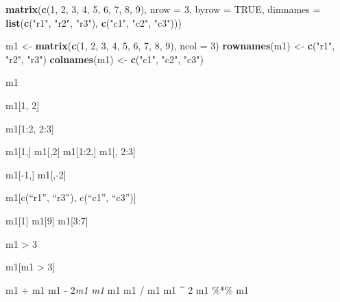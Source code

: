 \documentclass[]{book}
\newenvironment{Shaded}{\begin{snugshade}}{\end{snugshade}}
\newcommand{\DataTypeTok}[1]{\textcolor[rgb]{0.13,0.29,0.53}{#1}}
\newcommand{\DecValTok}[1]{\textcolor[rgb]{0.00,0.00,0.81}{#1}}
\newcommand{\KeywordTok}[1]{\textcolor[rgb]{0.13,0.29,0.53}{\textbf{#1}}}
\newcommand{\NormalTok}[1]{#1}
\newcommand{\OtherTok}[1]{\textcolor[rgb]{0.56,0.35,0.01}{#1}}
\newcommand{\StringTok}[1]{\textcolor[rgb]{0.31,0.60,0.02}{#1}}
\theoremstyle{definition}
\theoremstyle{definition}
\theoremstyle{definition}
\theoremstyle{remark}
\begin{document}
\begin{Shaded}
\begin{Highlighting}[]
\KeywordTok{matrix}\NormalTok{(}\KeywordTok{c}\NormalTok{(}\DecValTok{1}\NormalTok{, }\DecValTok{2}\NormalTok{, }\DecValTok{3}\NormalTok{, }\DecValTok{4}\NormalTok{, }\DecValTok{5}\NormalTok{, }\DecValTok{6}\NormalTok{, }\DecValTok{7}\NormalTok{, }\DecValTok{8}\NormalTok{, }\DecValTok{9}\NormalTok{), }\DataTypeTok{nrow =} \DecValTok{3}\NormalTok{, }\DataTypeTok{byrow =} \OtherTok{TRUE}\NormalTok{, }\DataTypeTok{dimnames =} \KeywordTok{list}\NormalTok{(}\KeywordTok{c}\NormalTok{(}\StringTok{"r1"}\NormalTok{, }\StringTok{"r2"}\NormalTok{, }\StringTok{"r3"}\NormalTok{), }\KeywordTok{c}\NormalTok{(}\StringTok{"c1"}\NormalTok{, }\StringTok{"c2"}\NormalTok{, }\StringTok{"c3"}\NormalTok{)))}
\end{Highlighting}
\end{Shaded}

\begin{Shaded}
\begin{Highlighting}[]
\NormalTok{m1 <-}\StringTok{ }\KeywordTok{matrix}\NormalTok{(}\KeywordTok{c}\NormalTok{(}\DecValTok{1}\NormalTok{, }\DecValTok{2}\NormalTok{, }\DecValTok{3}\NormalTok{, }\DecValTok{4}\NormalTok{, }\DecValTok{5}\NormalTok{, }\DecValTok{6}\NormalTok{, }\DecValTok{7}\NormalTok{, }\DecValTok{8}\NormalTok{, }\DecValTok{9}\NormalTok{), }\DataTypeTok{ncol =} \DecValTok{3}\NormalTok{)}
\KeywordTok{rownames}\NormalTok{(m1) <-}\StringTok{ }\KeywordTok{c}\NormalTok{(}\StringTok{"r1"}\NormalTok{, }\StringTok{"r2"}\NormalTok{, }\StringTok{"r3"}\NormalTok{)}
\KeywordTok{colnames}\NormalTok{(m1) <-}\StringTok{ }\KeywordTok{c}\NormalTok{(}\StringTok{"c1"}\NormalTok{, }\StringTok{"c2"}\NormalTok{, }\StringTok{"c3"}\NormalTok{)}

\NormalTok{m1}
\end{Highlighting}
\end{Shaded}

m1{[}1, 2{]}

m1{[}1:2, 2:3{]}

m1{[}1,{]} m1{[},2{]} m1{[}1:2,{]} m1{[}, 2:3{]}

m1{[}-1,{]} m1{[},-2{]}

m1{[}c(``r1'', ``r3''), c(``c1'', ``c3''){]}

m1{[}1{]} m1{[}9{]} m1{[}3:7{]}

m1 \textgreater{} 3

m1{[}m1 \textgreater{} 3{]}

m1 + m1 m1 - 2\emph{m1 m1 } m1 m1 / m1 m1 \^{} 2 m1 \%*\% m1
\end{document}
